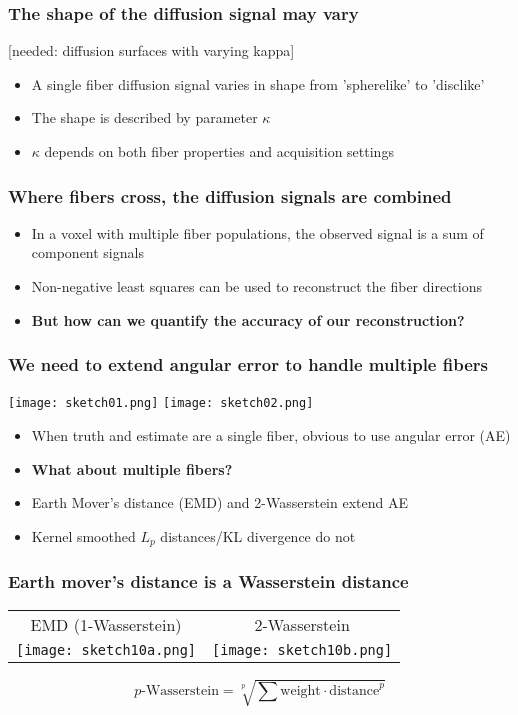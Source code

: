 \documentclass{beamer}
\begin{document}
\begin{frame}
\frametitle{The shape of the diffusion signal may vary}
[needed: diffusion surfaces with varying kappa]
\begin{itemize}
\item A single fiber diffusion signal varies in shape from 'spherelike' to 'disclike'
\item The shape is described by parameter $\kappa$
\item $\kappa$ depends on both fiber properties and acquisition settings
\end{itemize}
\end{frame}

\begin{frame}
\frametitle{Where fibers cross, the diffusion signals are combined}
\begin{itemize}
\item In a voxel with multiple fiber populations, the observed signal is a sum of component signals
\item Non-negative least squares can be used to reconstruct the fiber directions
\item \textbf{But how can we quantify the accuracy of our reconstruction?}
\end{itemize}
\end{frame}

\begin{frame}
\frametitle{We need to extend angular error to handle multiple fibers}
\begin{center}
\texttt{[image: sketch01.png]}
\texttt{[image: sketch02.png]}
\end{center}
\begin{itemize}
\item When truth and estimate are a single fiber, obvious to use angular error (AE)
\item \textbf{What about multiple fibers?}
\item Earth Mover's distance (EMD) and 2-Wasserstein extend AE
\item Kernel smoothed $L_p$ distances/KL divergence do not
\end{itemize}
\end{frame}

\begin{frame}
\frametitle{Earth mover's distance is a Wasserstein distance}
\centering
\begin{tabular}{cc}
EMD (1-Wasserstein) & 2-Wasserstein\\
\texttt{[image: sketch10a.png]}&
\texttt{[image: sketch10b.png]}
\end{tabular}
\[p\text{-Wasserstein} = \sqrt[p]{\sum \text{weight}\cdot \text{distance}^p}\]
\end{frame}
\end{document}
